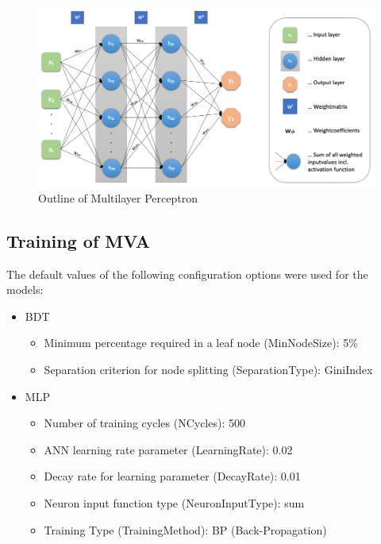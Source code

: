 \documentclass[11pt]{scrartcl}
\begin{document}
\begin{figure}[H]
	\begin{center}
	\includegraphics[width=1\textwidth]{figures/MLP.png}
	\caption{Outline of Multilayer Perceptron}
	\label{fig:MLP}
	\end{center}
\end{figure}

	\subsection{Training of MVA}
	
	The default values of the following configuration options were used for the models:
	
		\begin{itemize}
  			\item BDT
  					\begin{itemize}
  					\item Minimum percentage required in a leaf node (MinNodeSize): 5\%
  					\item Separation criterion for node splitting (SeparationType): GiniIndex
  					\end{itemize}
  		  	\item MLP
  					\begin{itemize}
  					\item Number of training cycles (NCycles): 500
  					\item ANN learning rate parameter (LearningRate): 0.02
  					\item Decay rate for learning parameter (DecayRate): 0.01
  					\item Neuron input function type (NeuronInputType): sum
  					\item Training Type (TrainingMethod): BP (Back-Propagation)
  					\end{itemize}		
		\end{itemize}
		
\end{document}

